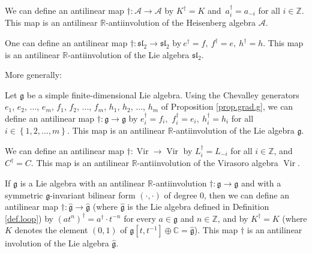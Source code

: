 \documentclass[etingof-lie.tex]{subfiles}
\begin{document}
\begin{proposition}
We can define an antilinear map $\dag:\mathcal{A}\rightarrow\mathcal{A}$ by
$K^{\dag}=K$ and\ $a_{i}^{\dag}=a_{-i}$ for all $i\in\mathbb{Z}$. This map is
an antilinear $\mathbb{R}$-antiinvolution of the Heisenberg algebra
$\mathcal{A}$.
\end{proposition}

\begin{proposition}
One can define an antilinear map $\dag:\mathfrak{sl}_{2}\rightarrow
\mathfrak{sl}_{2}$ by$\ e^{\dag}=f,\ f^{\dag}=e,\ h^{\dag}=h$. This map is an
antilinear $\mathbb{R}$-antiinvolution of the Lie algebra $\mathfrak{sl}_{2}$.
\end{proposition}

More generally:

\begin{proposition}
Let $\mathfrak{g}$ be a simple finite-dimensional Lie algebra. Using the
Chevalley generators $e_{1}$, $e_{2}$, $...$, $e_{m}$, $f_{1}$, $f_{2}$,
$...$, $f_{m}$, $h_{1}$, $h_{2}$, $...$, $h_{m}$ of Proposition
\ref{prop.grad.g}, we can define an antilinear map $\dag:\mathfrak{g}%
\rightarrow\mathfrak{g}$ by $e_{i}^{\dag}=f_{i},$ $f_{i}^{\dag}=e_{i}%
,\ h_{i}^{\dag}=h_{i}$ for all $i\in\left\{  1,2,...,m\right\}  $. This map is
an antilinear $\mathbb{R}$-antiinvolution of the Lie algebra $\mathfrak{g}$.
\end{proposition}

\begin{proposition}
We can define an antilinear map $\dag:\operatorname*{Vir}\rightarrow
\operatorname*{Vir}$ by $L_{i}^{\dag}=L_{-i}$ for all $i\in\mathbb{Z}$, and
$C^{\dag}=C$. This map is an antilinear $\mathbb{R}$-antiinvolution of the
Virasoro algebra $\operatorname*{Vir}$.
\end{proposition}

\begin{proposition}
If $\mathfrak{g}$ is a Lie algebra with an antilinear $\mathbb{R}%
$-antiinvolution $\dag:\mathfrak{g}\rightarrow\mathfrak{g}$ and with a
symmetric $\mathfrak{g}$-invariant bilinear form $\left(  \cdot,\cdot\right)
$ of degree $0$, then we can define an antilinear map $\dag
:\widehat{\mathfrak{g}}\rightarrow\widehat{\mathfrak{g}}$ (where
$\widehat{\mathfrak{g}}$ is the Lie algebra defined in Definition
\ref{def.loop}) by $\left(  at^{n}\right)  ^{\dag}=a^{\dag}\cdot t^{-n}$ for
every $a\in\mathfrak{g}$ and $n\in\mathbb{Z}$, and by $K^{\dag}=K$ (where $K$
denotes the element $\left(  0,1\right)  $ of $\mathfrak{g}\left[
t,t^{-1}\right]  \oplus\mathbb{C}=\widehat{\mathfrak{g}}$). This map $\dag$ is
an antilinear involution of the Lie algebra $\widehat{\mathfrak{g}}$.
\end{proposition}
\end{document}
